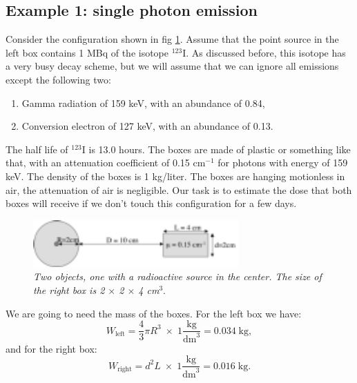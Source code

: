 \documentclass[11pt,oneside]{article}
\begin{document}
\subsection{Example 1: single photon emission}
Consider the configuration shown in fig \ref{fig:biol-singlephoton}.
Assume that the point source in the left box contains 1 MBq of the
isotope $^{123}$I. As discussed before, this isotope has a very
busy decay scheme, but we will assume that we can ignore all emissions
except the following two:
\begin{enumerate}
  \item Gamma radiation of 159 keV, with an abundance of 0.84,
  \item Conversion electron of 127 keV, with an abundance of 0.13.
\end{enumerate}
The half life of $^{123}$I is 13.0 hours.
The boxes are made of plastic or something like that, with an
attenuation coefficient of 0.15 cm$^{-1}$ for photons with energy
of 159 keV. The density of the boxes is 1 kg/liter.
The boxes are hanging motionless in air, the attenuation
of air is negligible. Our task is to estimate the dose that both boxes
will receive if we don't touch this configuration for a few days.
%
%
\begin{figure}[tb]
\centering
\includegraphics[width=0.7\textwidth]{figs/fig_biol_singlephoton.pdf}
\caption{\label{fig:biol-singlephoton} \emph{Two objects, one with a
radioactive source in the center. The size of the right box is
2 $\times$ 2 $\times$ 4 cm$^3$}.}
\end{figure}

We are going to need the mass of the boxes. For the left box we
have:
\begin{equation}
  W_{\mbox{left}} = \frac{4}{3} \pi R^3 \; \times \; 1 \frac{\mbox{kg}}{\mbox{dm}^3}
      = 0.034 \;\mbox{kg},
\end{equation}
and for the right box:
\begin{equation}
  W_{\mbox{right}} = d^2 L\; \times \; 1 \frac{\mbox{kg}}{\mbox{dm}^3}
      = 0.016 \;\mbox{kg}.
\end{equation}
\end{document}
